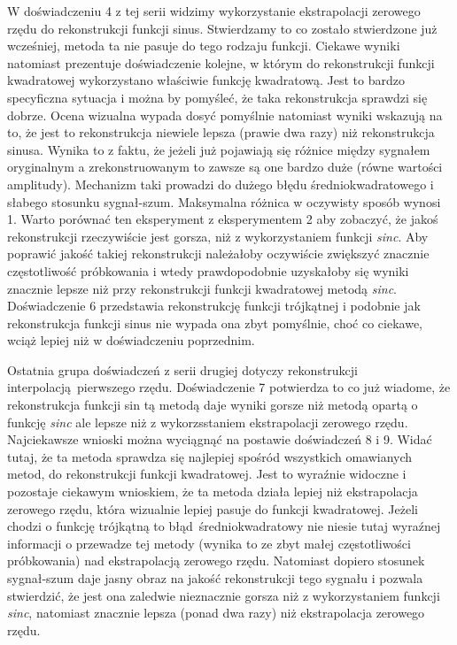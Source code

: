 \documentclass[12pt]{article}
\begin{document}
{{        W doświadczeniu 4 z tej serii widzimy wykorzystanie ekstrapolacji zerowego rzędu do rekonstrukcji
        funkcji sinus. Stwierdzamy to co zostało stwierdzone już wcześniej, metoda ta nie pasuje do tego
        rodzaju funkcji. Ciekawe wyniki natomiast prezentuje doświadczenie kolejne, w którym do
        rekonstrukcji funkcji kwadratowej wykorzystano właściwie funkcję kwadratową. Jest to bardzo
        specyficzna sytuacja i można by pomyśleć, że taka rekonstrukcja sprawdzi się dobrze. Ocena wizualna
        wypada dosyć pomyślnie natomiast wyniki wskazują na to, że jest to rekonstrukcja niewiele lepsza
        (prawie dwa razy) niż rekonstrukcja sinusa. Wynika to z faktu, że jeżeli już pojawiają się różnice
        między sygnałem oryginalnym a zrekonstruowanym to zawsze są one bardzo duże (równe wartości
        amplitudy). Mechanizm taki prowadzi do dużego błędu średniokwadratowego i słabego stosunku
        sygnał-szum. Maksymalna różnica w oczywisty sposób wynosi 1. Warto porównać ten eksperyment z
        eksperymentem 2 aby zobaczyć, że jakoś rekonstrukcji rzeczywiście jest gorsza, niż z wykorzystaniem
        funkcji \emph{sinc}. Aby poprawić jakość takiej rekonstrukcji należałoby oczywiście zwiększyć
        znacznie częstotliwość próbkowania i wtedy prawdopodobnie uzyskałoby się wyniki znacznie lepsze niż
        przy rekonstrukcji funkcji kwadratowej metodą \emph{sinc}. Doświadczenie 6 przedstawia rekonstrukcję
        funkcji trójkątnej i podobnie jak rekonstrukcja funkcji sinus nie wypada ona zbyt pomyślnie, choć co
        ciekawe, wciąż lepiej niż w doświadczeniu poprzednim.

        Ostatnia grupa doświadczeń z serii drugiej dotyczy rekonstrukcji interpolacją pierwszego rzędu.
        Doświadczenie 7 potwierdza to co już wiadome, że rekonstrukcja funkcji sin tą metodą daje wyniki
        gorsze niż metodą opartą o funkcję \emph{sinc} ale lepsze niż z wykorzsstaniem ekstrapolacji
        zerowego rzędu. Najciekawsze wnioski można wyciągnąć na postawie doświadczeń 8 i 9. Widać tutaj, że
        ta metoda sprawdza się najlepiej spośród wszystkich omawianych metod, do rekonstrukcji funkcji
        kwadratowej. Jest to wyraźnie widoczne i pozostaje ciekawym wnioskiem, że ta metoda działa lepiej
        niż ekstrapolacja zerowego rzędu, która wizualnie lepiej pasuje do funkcji kwadratowej. Jeżeli
        chodzi o funkcję trójkątną to błąd średniokwadratowy nie niesie tutaj wyraźnej informacji o
        przewadze tej metody (wynika to ze zbyt małej częstotliwości próbkowania) nad ekstrapolacją zerowego
        rzędu. Natomiast dopiero stosunek sygnał-szum daje jasny obraz na jakość rekonstrukcji tego sygnału
        i pozwala stwierdzić, że jest ona zaledwie nieznacznie gorsza niż z wykorzystaniem funkcji
        \emph{sinc}, natomiast znacznie lepsza (ponad dwa razy) niż ekstrapolacja zerowego rzędu.

}}
\end{document}
